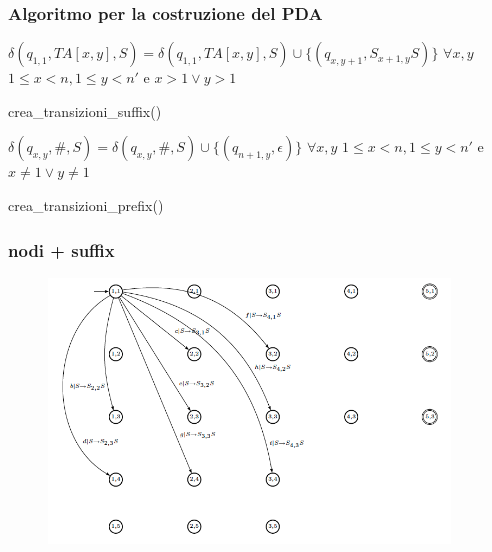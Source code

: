 \documentclass{beamer}
\begin{document}
\begin{frame}
\frametitle{Algoritmo per la costruzione del PDA}
\begin{algorithm}[H]
\begin{algorithmic}[1]
	\STATE $\delta(q_{1,1},TA[x,y],S) = \delta(q_{1,1},TA[x,y],S) \cup \{(q_{x,y+1},S_{x+1,y}S)\}$
	\STATE  $\forall x,y$ $1 \leq x < n, 1\leq y < n'$ e $x > 1 \vee y > 1$
\end{algorithmic}
\caption{crea\_transizioni\_suffix()}
\end{algorithm}

\begin{algorithm}[H]
\begin{algorithmic}[1]
	\STATE $\delta(q_{x,y},\#,S) = \delta(q_{x,y},\#,S) \cup \{(q_{n+1,y},\epsilon)\}$
	\STATE  $\forall x,y$ $1 \leq x < n, 1\leq y < n'$ e $x \not= 1 \vee y \not= 1$
\end{algorithmic}
\caption{crea\_transizioni\_prefix()}
\end{algorithm}

\end{frame}


\begin{frame}
\frametitle{nodi + suffix}
\begin{figure}[p]

    \includegraphics[width=0.95\textwidth]{pda_suf.png}
\end{figure}
\end{frame}
\end{document}
